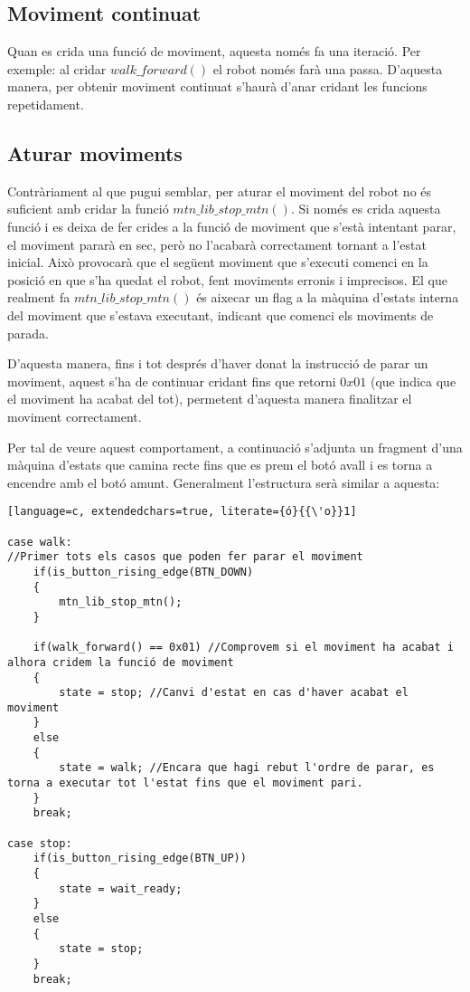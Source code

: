 \documentclass{article}
\begin{document}
\subsection{Moviment continuat}
Quan es crida una funció de moviment, aquesta només fa una iteració. Per exemple: al cridar $walk\_forward()$ el robot només farà una passa. D'aquesta manera, per obtenir moviment continuat s'haurà d'anar cridant les funcions repetidament. 

\subsection{Aturar moviments}
Contràriament al que pugui semblar, per aturar el moviment del robot no és suficient amb cridar la funció $mtn\_lib\_stop\_mtn()$. Si només es crida aquesta funció i es deixa de fer crides a la funció de moviment que s'està intentant parar, el moviment pararà en sec, però no l'acabarà correctament tornant a l'estat inicial. Això provocarà que el següent moviment que s'executi comenci en la posició en que s'ha quedat el robot, fent moviments erronis i imprecisos. El que realment fa $mtn\_lib\_stop\_mtn()$ és aixecar un flag a la màquina d'estats interna del moviment que s'estava executant, indicant que comenci els moviments de parada. 

D'aquesta manera, fins i tot després d'haver donat la instrucció de parar un moviment, aquest s'ha de continuar cridant fins que retorni $0x01$ (que indica que el moviment ha acabat del tot), permetent d'aquesta manera finalitzar el moviment correctament. 

Per tal de veure aquest comportament, a continuació s'adjunta un fragment d'una màquina d'estats que camina recte fins que es prem el botó avall i es torna a encendre amb el botó amunt. Generalment l'estructura serà similar a aquesta:

\begin{lstlisting}[language=c, extendedchars=true, literate={ó}{{\'o}}1]

case walk: 	
//Primer tots els casos que poden fer parar el moviment
	if(is_button_rising_edge(BTN_DOWN)
	{
		mtn_lib_stop_mtn(); 
	}
	
	if(walk_forward() == 0x01) //Comprovem si el moviment ha acabat i alhora cridem la funció de moviment
	{
		state = stop; //Canvi d'estat en cas d'haver acabat el moviment
	}
	else
	{
		state = walk; //Encara que hagi rebut l'ordre de parar, es torna a executar tot l'estat fins que el moviment pari.
	}
	break;	      

case stop: 
	if(is_button_rising_edge(BTN_UP))
	{
		state = wait_ready;
	}
	else
	{
		state = stop;
	}
	break;
\end{lstlisting}
\end{document}
